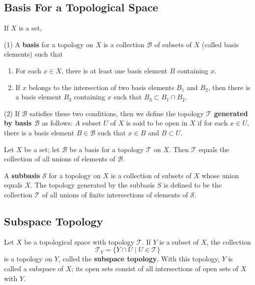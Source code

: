 \documentclass[12pt, a4paper, oneside]{book}
\begin{document}
\subsection{Basis For a Topological Space}
\begin{definition}
    If $X$ is a set,

    (1) A \textbf{basis} for a topology on $X$ is a collection $\mathscr{B}$ of subsets of $X$ (called basis elements) such that
    \begin{enumerate}[label=(\roman*)]
        \item For each $x \in X$, there is at least one basis element $B$ containing $x$.
        \item If $x$ belongs to the intersection of two basis elements $B_1$ and $B_2$, then there is a basis element $B_3$ containing $x$ such that $B_3 \subset B_1 \cap B_2$.
    \end{enumerate}

    (2) If $\mathscr{B}$ satisfies these two conditions, then we define the topology \textbf{$\mathcal{T}$ generated by basis $\mathcal{B}$} as follows: $A$ subset $U$ of $X$ is said to be open in $X$ if for each $x \in U$, there is a basis element $B \in \mathscr{B}$ such that $x \in B$ and $B \subset U$.
\end{definition}

\begin{proposition}
    Let $X$ be a set; let $\mathscr{B}$ be a basis for a topology $\mathcal{T}$ on $X$. Then $\mathcal{T}$ equals the collection of all unions of elements of $\mathscr{B}$.
\end{proposition}


\begin{definition}
    A \textbf{subbasis} $\mathcal{S}$ for a topology on $X$ is a collection of subsets of $X$ whose union equals $X$.
    The topology generated by the subbasis $S$ is defined to be the collection $\mathcal{T}$ of all unions of finite intersections of elements of $\mathcal{S}$.
\end{definition}

\subsection{Subspace Topology} %
\begin{definition}
    Let $X$ be a topological space with topology $\mathcal{T}$. If $Y$ is a subset of $X$, the collection
    \begin{equation*}
        \mathcal{T}_Y=\{Y \cap U \mid U \in \mathcal{T}\}
    \end{equation*}
    is a topology on $Y$, called the \textbf{subspace topology}. With this topology, $Y$ is called a subspace of $X$; its open sets consist of all intersections of open sets of $X$ with $Y$.
\end{definition}
\end{document}

